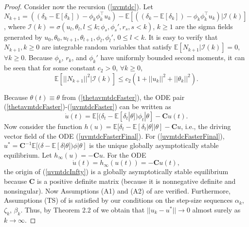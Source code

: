 \begin{proof}
Consider now the recursion (\ref{uvmtdc}).
Let
$N_{k+1}=((\delta_k-\mathbb{E}[\delta_k]) - {\phi}_k {\phi}^{\top}_k {u}_k) -\mathbb{E}[((\delta_k-\mathbb{E}[\delta_k]) - {\phi}_k {\phi}^{\top}_k {u}_k)|\mathcal{I} (k)]$,
where $\mathcal{I}(k)=\sigma({u}_l,{\theta}_l,l\leq k;{\phi}_s,{\phi}_s',r_s,s<k)$, 
$k\geq 1$ are the sigma fields
generated by ${u}_0,{\theta}_0,{u}_{l+1},{\theta}_{l+1},{\phi}_l,{\phi}_l'$,
$0\leq l<k$.
It is easy to verify that $N_{k+1},k\geq0$ are integrable random variables that 
satisfy $\mathbb{E}[N_{k+1}|\mathcal{I}(k)]=0$, $\forall k\geq0$.
Because ${\phi}_k$, $r_k$, and ${\phi}_k'$ have
uniformly bounded second moments, it can be seen that for some constant
$c_2>0$, $\forall k\geq0$,
\begin{equation*}
\mathbb{E}[||N_{k+1}||^2|\mathcal{I}(k)]\leq
c_2(1+||{u}_k||^2+||{\theta}_k||^2).
\end{equation*}

Because ${\theta}(t)\equiv {\theta}$ from (\ref{thetavmtdcFaster}), the ODE pair (\ref{thetavmtdcFaster})-(\ref{uvmtdcFaster})
can be written as 
\begin{equation}
 \dot{{u}}(t) = \mathbb{E}[(\delta_t-\mathbb{E}[\delta_t|{\theta}]){\phi}_t|{\theta}] - \textbf{C}{u}(t).
    \label{uvmtdcFasterFinal}
\end{equation}
Now consider the function $h({u})=\mathbb{E}[\delta_t-\mathbb{E}[\delta_t|{\theta}]|{\theta}] -\textbf{C}{u}$, i.e., the
driving vector field of the ODE (\ref{uvmtdcFasterFinal}). For (\ref{uvmtdcFasterFinal}),
${u}^* = \textbf{C}^{-1}\mathbb{E}[(\delta-\mathbb{E}[\delta|{\theta}]){\phi}|{\theta}]$ is the unique globally asymptotically
stable equilibrium. Let $h_{\infty}({u})=-\textbf{C}{u}$.
For the ODE
\begin{equation}
 \dot{{u}}(t) = h_{\infty}({u}(t))= -\textbf{C}{u}(t),
    \label{uvmtdcInfty}
\end{equation}
the origin of (\ref{uvmtdcInfty}) is a globally asymptotically stable
equilibrium because $\textbf{C}$ is a positive definite matrix (because it is nonnegative definite and nonsingular).
Now Assumptions (A1) and (A2) of \cite{borkar2000ode} are verified.
Furthermore, Assumptions (TS) of \cite{borkar2000ode} is satisfied by our
conditions on the step-size sequences $\alpha_k$,$\zeta_k$, $\beta_k$. Thus,
by Theorem 2.2 of \cite{borkar2000ode} we obtain that
$||{u}_k-{u}^*||\rightarrow 0$ almost surely as $k\rightarrow \infty$.


\end{proof}
